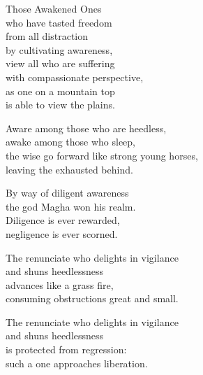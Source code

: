 Those Awakened Ones\\
who have tasted freedom\\
from all distraction\\
by cultivating awareness,\\
view all who are suffering\\
with compassionate perspective,\\
as one on a mountain top\\
is able to view the plains.


Aware among those who are heedless,\\
awake among those who sleep,\\
the wise go forward like strong young horses,\\
leaving the exhausted behind.


By way of diligent awareness\\
the god Magha won his realm.\\
Diligence is ever rewarded,\\
negligence is ever scorned.


The renunciate who delights in vigilance\\
and shuns heedlessness\\
advances like a grass fire,\\
consuming obstructions great and small.


The renunciate who delights in vigilance\\
and shuns heedlessness\\
is protected from regression:\\
such a one approaches liberation.

